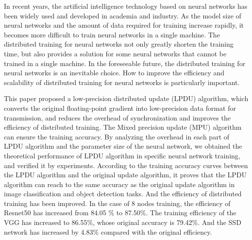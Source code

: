 \begin{eabstract}
In recent years, the artificial intelligence technology based on neural networks has been widely used and developed in academia and industry. As the model size of neural networks and the amount of data required for training increase rapidly, it becomes more difficult to train neural networks in a single machine. The distributed training for neural networks not only greatly shorten the training time, but also provides a solution for some neural networks that cannot be trained in a single machine. In the foreseeable future, the distributed training for neural networks is an inevitable choice. How to improve the efficiency and scalability of distributed training for neural networks is particularly important.

This paper proposed a low-precision distributed update (LPDU) algorithm, which converts the original floating-point gradient into low-precision data format for transmission, and reduces the overhead of synchronization and improves the efficiency of distributed training. The Mixed precision update (MPU) algorithm can ensure the training accuracy. By analyzing the overhead in each part of LPDU algorithm and the parameter size of the neural network, we obtained the theoretical performance of LPDU algorithm in specific neural network training, and verified it by experiments. According to the training accuracy curves between the LPDU algorithm and the original update algorithm, it proves that the LPDU algorithm can reach to the same accuracy as the original update algorithm in image classification and object detection tasks. And the efficiency of distributed training has been improved. In the case of 8 nodes training, the efficiency of Resnet50 has increased from 84.05 \% to 87.50\%. The training efficiency of the VGG has increased to 86.55\%, whose original accuracy is 79.42\%. And the SSD network has increased by 4.83\% compared with the original efficiency.


\end{eabstract}
